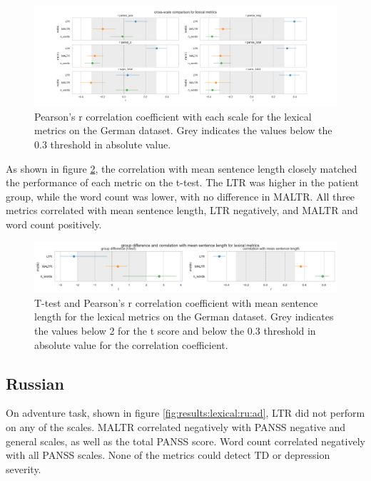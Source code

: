 \begin{figure}[h!]
    \includegraphics[width=1.2\textwidth, center]{Figures/chapter_4/lexical/de_scale_r.png} 
\captionsetup{width=\textwidth}
\caption[Lexical Metrics: German]{\label{fig:results:lexical:de} Pearson's r correlation coefficient with each scale for the lexical metrics on the German dataset. Grey indicates the values below the 0.3 threshold in absolute value.}
\end{figure}

As shown in figure \ref{fig:results:lexical:de:ttest}, the correlation with mean sentence length closely matched the performance of each metric on the t-test. The LTR was higher in the patient group, while the word count was lower, with no difference in MALTR. All three metrics correlated with mean sentence length, LTR negatively, and MALTR and word count positively.

\begin{figure}[ht!]
    \includegraphics[width=\textwidth, center]{Figures/chapter_4/lexical/de_t_test_corr_len.png} 
\captionsetup{width=\textwidth}
\caption[Lexical Metrics: German (T-Test)]{\label{fig:results:lexical:de:ttest} T-test and Pearson's r correlation coefficient with mean sentence length for the lexical metrics on the German dataset. Grey indicates the values below 2 for the t score and below the 0.3 threshold in absolute value for the correlation coefficient.}
\end{figure}


\subsection{Russian}
On adventure task, shown in figure \ref{fig:results:lexical:ru:ad}, LTR did not perform on any of the scales. MALTR correlated negatively with PANSS negative and general scales, as well as the total PANSS score. Word count correlated negatively with all PANSS scales. None of the metrics could detect TD or depression severity.


